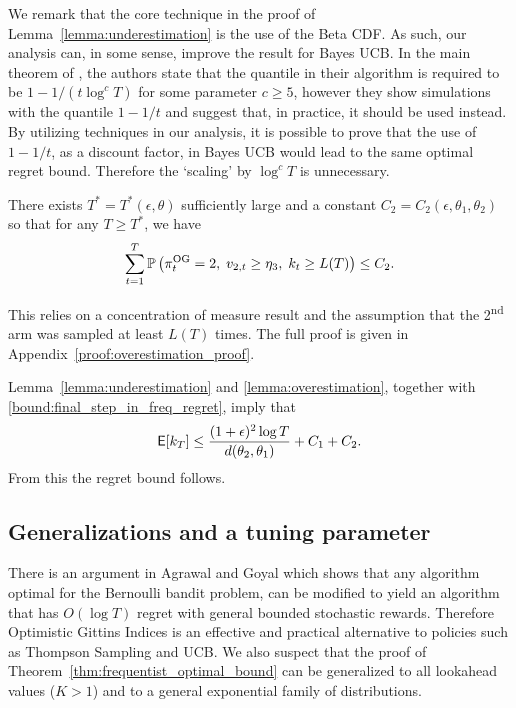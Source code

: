 \begin{myproof}[Proof.]
\begin{myproof}
		We remark that the core technique in the proof of Lemma~\ref{lemma:underestimation} is the use of the Beta CDF. As such, our analysis can, in some sense, improve the result for Bayes UCB. In the main theorem of \cite{kaufmann2012thompson}, the authors state that the quantile in their algorithm is required to be $1 - 1/(t \log^c T)$ for some parameter $c \ge 5$, however they show simulations with the quantile $1 -1/t$ and suggest that, in practice, it should be used instead. By utilizing techniques in our analysis, it is possible to prove that the use of $1-1/t$, as a discount factor, in Bayes UCB would lead to the same optimal regret bound. Therefore the `scaling' by $\log^c T$ is unnecessary.
	\end{myproof}
	\begin{lemma} \label{lemma:overestimation}
		There exists $T^* = T^*(\epsilon, \theta)$ sufficiently large and a constant $C_2 = C_2(\epsilon, \theta_1, \theta_2)$ so that for any $T \ge T^*$, we have
		\begin{equation*}
		\sum_{t=1}^T \P{\pi_t^{\rm OG} = 2,\; v_{2,t} \ge \eta_3, \; k_t \ge L(T)} \le C_2.
		\end{equation*}
	\end{lemma}
	\begin{myproof}
		This relies on a concentration of measure result and the assumption that the 2\textsuperscript{nd} arm was sampled at least $L(T)$ times. The full proof is given in Appendix~\ref{proof:overestimation_proof}.
	\end{myproof}
	Lemma~\ref{lemma:underestimation} and \ref{lemma:overestimation}, together with \eqref{bound:final_step_in_freq_regret}, imply that
	\[
	\E[k_T] \le \frac{(1+\epsilon)^2 \log T}{d(\theta_2, \theta_1)} +  C_1 +  C_2.
	\]
	From this the regret bound follows.
\end{myproof}
\subsection{Generalizations and a tuning parameter}
There is an argument in Agrawal and Goyal \cite{agrawalanalysis} which shows that any algorithm optimal for the Bernoulli bandit problem, can be modified to yield an algorithm that has $O(\log T)$ regret with general bounded stochastic rewards. Therefore Optimistic Gittins Indices is an effective and practical alternative to policies such as Thompson Sampling and UCB. We also suspect that the proof of Theorem~\ref{thm:frequentist_optimal_bound} can be generalized to all lookahead values ($K > 1$) and to a general exponential family of distributions.

